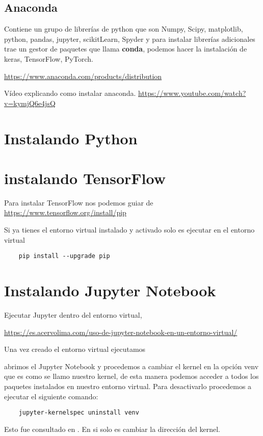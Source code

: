\subsection{Anaconda}
Contiene un grupo de librer\'ias de python que son Numpy, Scipy, matplotlib, python, pandas, jupyter, scikitLearn, Spyder y para instalar librer\'ias adicionales trae un gestor de paquetes que llama {\bf conda}, podemos hacer la instalaci\'on de keras, TensorFlow, PyTorch.

\url{https://www.anaconda.com/products/distribution}

V\'ideo explicando como instalar anaconda.
\url{https://www.youtube.com/watch?v=kymjQ6e4jsQ}
\section{Instalando Python}

\section{instalando TensorFlow}

Para instalar TensorFlow nos podemos guiar de \url{https://www.tensorflow.org/install/pip}

Si ya tienes el entorno virtual instalado y activado solo es ejecutar en el entorno virtual 
\begin{verbatim}
	pip install --upgrade pip
\end{verbatim}



\section{Instalando Jupyter Notebook}
Ejecutar Jupyter dentro del entorno virtual, 

\url{https://es.acervolima.com/uso-de-jupyter-notebook-en-un-entorno-virtual/}

Una vez creado el entorno virtual ejecutamos 

abrimos el Jupyter Notebook y procedemos a cambiar el kernel en la opci\'on venv que es como se llamo nuestro kernel, de esta manera podemos acceder a todos los paquetes instalados en nuestro entorno virtual. Para desactivarlo procedemos a ejecutar el siguiente comando: 
\begin{verbatim}
	jupyter-kernelspec uninstall venv
\end{verbatim}
Esto fue consultado en \cite{JupyterEnviroments}.
En si solo es cambiar la direcci\'on del kernel.

